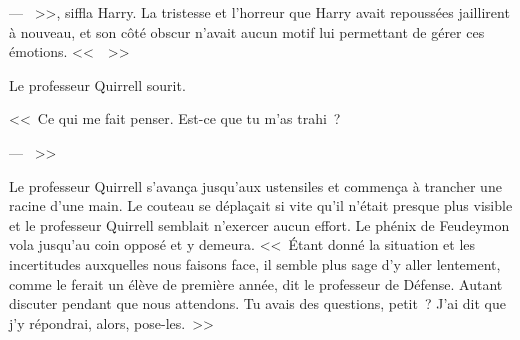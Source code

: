 --- ~>>, siffla Harry. La tristesse et l'horreur que Harry avait repoussées jaillirent à nouveau, et son côté obscur n'avait aucun motif lui permettant de gérer ces émotions. <<~~>>

Le professeur Quirrell sourit.

<<~Ce qui me fait penser. Est-ce que tu m'as trahi~?

--- ~>>

Le professeur Quirrell s'avança jusqu'aux ustensiles et commença à trancher une racine d'une main. Le couteau se déplaçait si vite qu'il n'était presque plus visible et le professeur Quirrell semblait n'exercer aucun effort. Le phénix de Feudeymon vola jusqu'au coin opposé et y demeura. <<~Étant donné la situation et les incertitudes auxquelles nous faisons face, il semble plus sage d'y aller lentement, comme le ferait un élève de première année, dit le professeur de Défense. Autant discuter pendant que nous attendons. Tu avais des questions, petit~? J'ai dit que j'y répondrai, alors, pose-les.~>>
